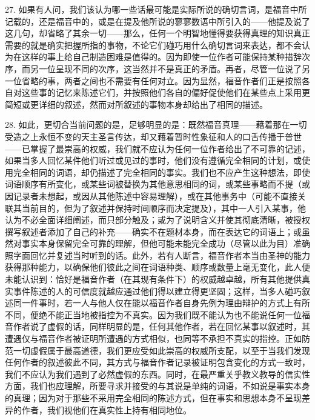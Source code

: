 27. 如果有人问，我们该认为哪一些话最可能是实际所说的确切言词，是福音中所记载的，还是福音中的，或是在提及他所说的寥寥数语中所引入的——他提及说了这几句，却省略了其余一切——那么，任何一个明智地懂得要获得真理的知识真正需要的就是确实把握所指的事物，不论它们碰巧用什么确切言词来表达，都不会认为在这样的事上给自己制造困难是值得的。因为即使一位作者可能保持某种措辞次序，而另一位呈现不同的次序，这当然并不是真正的矛盾。再者，尽管一位说了另一位省略的事，两者之间也不需要有任何对立。因为显然，福音作者们正是按照各自对这些事的记忆来陈述它们，并按照他们各自的偏好促使他们在某些点上采用更简短或更详细的叙述，然而对所叙述的事物本身却给出了相同的描述。\par

28. 如此，更切合当前问题的是，足够明显的是：既然福音真理——藉着那在一切受造之上永恒不变的天主圣言传达，却又藉着暂时性象征和人的口舌传播于普世——已掌握了最崇高的权威，我们就不应认为任何一位作者给出了不可靠的记述，如果当多人回忆某件他们听过或见过的事时，他们没有遵循完全相同的计划，或使用完全相同的词语，却仍描述了完全相同的事实。我们也不应产生这种想法，即使词语顺序有所变化，或某些词被替换为其他意思相同的词，或某些事略而不提（或因记录者未想起，或因从其他陈述中容易理解），或在其他事务中（可能不直接关联其当前目的，但为了叙述并保持时间顺序而决定提及），其中一人引入某事，他认为不必全面详细阐述，而只部分触及；或为了说明含义并使其彻底清晰，被授权撰写叙述者添加了自己的补充——确实不在题材本身，而在表达它的词语上；或虽然对事实本身保留完全可靠的理解，但他可能未能完全成功（尽管以此为目）准确照字面回忆并复述当时听到的话。此外，若有人断言，福音作者本当由圣神的能力获得那种能力，以确保他们彼此之间在词语种类、顺序或数量上毫无变化，此人便未能认识到：恰好是福音作者（在其现有条件下）的权威越卓越，所有其他提供真实事件陈述的人的可信度就越应通过他们得以建立得更坚固；这样，当多人碰巧叙述同一件事时，若一人与他人仅在能以福音作者自身先例为理由辩护的方式上有所不同，便绝不能正当地被指控为不真实。因为我们既不能认为也不能说任何一位福音作者说了虚假的话，同样明显的是，任何其他作者，若在回忆某事以叙述时，其遭遇仅与福音作者被证明所遭遇的方式相似，也同等不承担不真实的指控。正如防范一切虚假属于最高道德，我们更应受如此崇高的权威所支配，以至于当我们发现任何作者的叙述彼此不同，其方式与福音作者记录被证明包含变化的方式一致时，我们不应认为我们遇到了必然虚假的东西。同时，在最严重关乎教义教导的信实性方面，我们也应理解，所要寻求并接受的与其说是单纯的词语，不如说是事实本身的真理；因为对于那些不采用完全相同的陈述方式，但在事实和思想本身不呈现差异的作者，我们视他们在真实性上持有相同地位。\par

